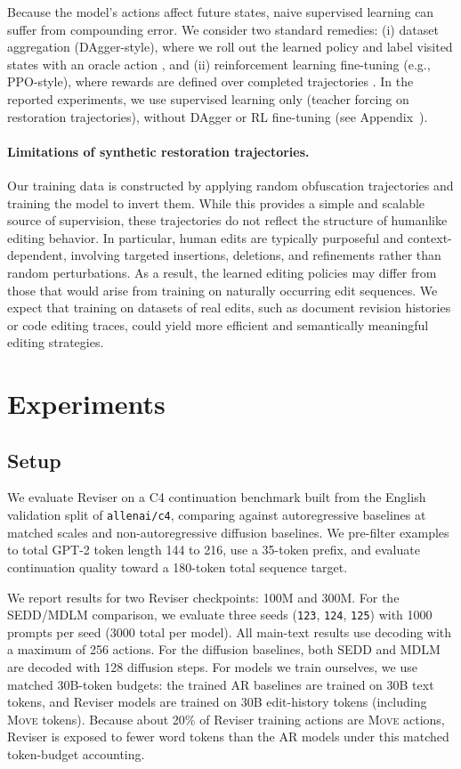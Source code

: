 \documentclass[11pt]{article}
\DeclareRobustCommand{\Move}{\ifmmode\text{\textsc{Move}}\else\textsc{Move}\fi}
\begin{document}
Because the model's actions affect future states, naive supervised learning can suffer from compounding error. We consider two standard remedies: (i) dataset aggregation (DAgger-style), where we roll out the learned policy and label visited states with an oracle action \citep{ross2011dagger}, and (ii) reinforcement learning fine-tuning (e.g., PPO-style), where rewards are defined over completed trajectories \citep{schulman2017ppo}. In the reported experiments, we use supervised learning only (teacher forcing on restoration trajectories), without DAgger or RL fine-tuning (see Appendix~).

\paragraph{Limitations of synthetic restoration trajectories.}
Our training data is constructed by applying random obfuscation trajectories and training the model to invert them. While this provides a simple and scalable source of supervision, these trajectories do not reflect the structure of humanlike editing behavior. In particular, human edits are typically purposeful and context-dependent, involving targeted insertions, deletions, and refinements rather than random perturbations. As a result, the learned editing policies may differ from those that would arise from training on naturally occurring edit sequences. We expect that training on datasets of real edits, such as document revision histories or code editing traces, could yield more efficient and semantically meaningful editing strategies.

\section{Experiments}
\label{sec:experiments}

\subsection{Setup}
\label{sec:setup_exp}

We evaluate Reviser on a C4 continuation benchmark built from the English validation split of \texttt{allenai/c4}, comparing against autoregressive baselines at matched scales and non-autoregressive diffusion baselines. We pre-filter examples to total GPT-2 token length 144 to 216, use a 35-token prefix, and evaluate continuation quality toward a 180-token total sequence target.

We report results for two Reviser checkpoints: 100M and 300M. For the SEDD/MDLM comparison, we evaluate three seeds (\texttt{123}, \texttt{124}, \texttt{125}) with 1000 prompts per seed (3000 total per model). All main-text results use decoding with a maximum of 256 actions.
For the diffusion baselines, both SEDD and MDLM are decoded with 128 diffusion steps.
For models we train ourselves, we use matched 30B-token budgets: the trained AR baselines are trained on 30B text tokens, and Reviser models are trained on 30B edit-history tokens (including \Move{} tokens). Because about 20\% of Reviser training actions are \Move{} actions, Reviser is exposed to fewer word tokens than the AR models under this matched token-budget accounting.
\end{document}
